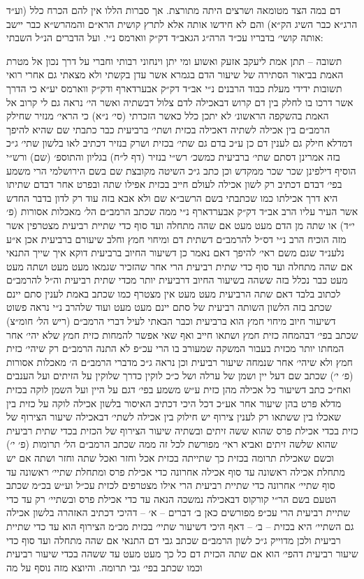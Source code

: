 \documentclass[12pt, openany]{book}
\begin{document}
\begin{multicols}{2}
דם במה הצד מטומאה ושרצים היתה מתורצת. אך סברות הללו אין להם הכרח כלל (וע״ד הרג״א כבר השיג הק״א) והם לא חידשו אותה אלא לתרץ קושית הרא״ם והמהרש״א כבר יישב אותה קושי׳ בדבריו עכ״ד הרה״ג הגאב״ד דק״ק ווארמס נ״י. ועל הדברים הנ״ל השבתי:\\\vspace{0pt}

תשובה – תתן אמת ליעקב אזעק ואשוע ומי יתן וינחוני רבותי וחברי על דרך נכון אל מטרת האמת בביאור הסתירה של שיעור הדם בגמרא אשר עדן בקשתי ולא מצאתי גם אחרי רואי תשובות ידידי מעלת כבוד הרבנים נ״י אב״ד דק״ק אבערדארף ודק״ק ווארמס יע״א כי הדרך אשר דרכו בו לחלק בין דם קרוש דבאכילה לדם צלול דבשתיה ואשר הי׳ נראה גם לי קרוב אל האמת בהשקפה הראשונ׳ לא יתכן כלל כאשר הזכרתי (סי׳ נ״א) כי הראי׳ מנזיר שחילק הרמב״ם בין אכילה לשתיה דאכילה בכזית ושתי׳ ברביעית כבר כתבתי שם שהיא להיפך דמדלא חילק גם לענין דם כן ע״כ בדם גם שתי׳ בכזית ושרק בנזיר דכתיב לאו בלשון שתי׳ ג״כ בזה אמרינן דסתם שתי׳ ברביעית כמשכ׳ רש״י בנזיר (דף ל״ח) בגליון והתוספ׳ (שם) ורש״י הוסיף דילפינן שכר שכר ממקדש וכן כתב ג״כ השיטה מקובצת שם בשם הירושלמי הרי משמע בפי׳ דבדם דכתיב רק לשון אכילה לעולם חייב בכזית אפילו שתה ובפרט אחר דבדם שתיתו היא דרך אכילתו כמו שכתבתי בשם הרשב״א שם ולא אבא בזה עוד רק לדון בדבר החדש אשר העיר עליו הרב אב״ד דק״ק אבערדארף נ״י ממה שכתב הרמב״ם הל׳ מאכלות אסורות (פ׳ י״ד) או שתה מן הדם מעט מעט אם שהה מתחלה ועד סוף כדי שתיית רביעית מצטרפין אשר מזה הוכיח הרב נ״י דס״ל להרמב״ם דשתית דם ומיחוי חמץ וחלב שיעורם ברביעית אכן א״ע נלענ״ד שגם משם ראי׳ להיפך דאם נאמר כן דשיעור החיוב ברביעית דוקא איך שייך התנאי אם שהה מתחלה ועד סוף כדי שתית רביעית הרי אחר שהזכיר שגמאו מעט מעט ושתה מעט מעט כבר נכלל בזה ששהה בשיעור החיוב דרביעית יותר מכדי שתית רביעית וה״ל להרמב״ם לכתוב בלבד דאם שתה הרביעית מעט מעט אין מצטרף כמו שכתב באמת לענין סתם יינם שכתב בזה הלשון השותה רביעית של סתם יינם מעט מעט ועוד שלהרב נ״י נראה פשוט דשיעור חיוב מיחוי חמץ הוא ברביעית וכבר הבאתי לעיל דברי הרמב״ם (ריש הל׳ חומ״צ) שכתב בפי׳ דבהמחה כזית חמץ ושתאו חייב ואף שאי אפשר להמחות כזית חמץ שלא יהי׳ אחר המחתו יותר מכזית בעבור המשקה שמעורב בו הרי עכ״פ לא התנה הרמב״ם רק שיהי׳ כזית חמץ ולא שיהי׳ אחר שנמחה שיעור רביעית וכן נראה ג״כ מדברי הרמב״ם ה׳ מאכלות אסורות (פ׳ י׳) שכתב שם דעל יין ושמן של ערלה ושל כ״כ לוקין כדרך שלוקין על הזיתים ועל הענבים ואח״כ כתב דשיעור כל אכילה מהן כזית ע״ש משמע בפי׳ דגם על היין ועל השמן לוקה בכזית מדלא פרט בהן שיעור אחר אע״כ דכל היכי דכתיב האיסור בלשון אכילה לוקה על כזית בין שאכלו בין ששתאו רק לענין צירוף יש חילוק בין אכילה לשתי׳ דבאכילה שיעור הצירוף של כזית בכדי אכילת פרס שהוא ששה זיתים ובשתיה שיעור הצירוף של הכזית בכדי שתית רביעית שהוא שלשה זיתים ואביא ראי׳ מפורשת לכל זה ממה שכתב הרמב״ם הל׳ תרומות (פ׳ י׳) וכשם שאכילת תרומה בכזית כך שתייתה בכזית אכל וחזר ואכל שתה וחזר ושתה אם יש מתחלת אכילה ראשונה עד סוף אכילה אחרונה כדי אכילת פרס ומתחלת שתיי׳ ראשונה עד סוף שתיי׳ אחרונה כדי שתיית רביעית הרי אילו מצטרפים לכזית עכ״ל וע״ש בכ״מ שכתב הטעם בשם הר״י קורקוס דבאכילה נמשכה הנאה עד כדי אכילת פרס ובשתיי׳ רק עד כדי שתיית רביעית הרי עכ״פ מפורשים כאן ב׳ דברים – א׳ – דהיכי דכתיב האזהרה בלשון אכילה גם השתיי׳ היא בכזית – ב׳ – דאף היכי דשיעור שתיי׳ בכזית מכ״מ הצירוף הוא עד כדי שתיית רביעית ולכן מדוייק ג״כ לשון הרמב״ם שכתב גבי דם התנאי אם שהה מתחלה ועד סוף כדי שיעור רביעית דהפי׳ הוא אם שתה הכזית דם כל כך מעט מעט עד ששהה בכדי שיעור רביעית וכמו שכתב בפי׳ גבי תרומה. והיוצא מזה נוסף על מה 
\end{multicols}
\end{document}
